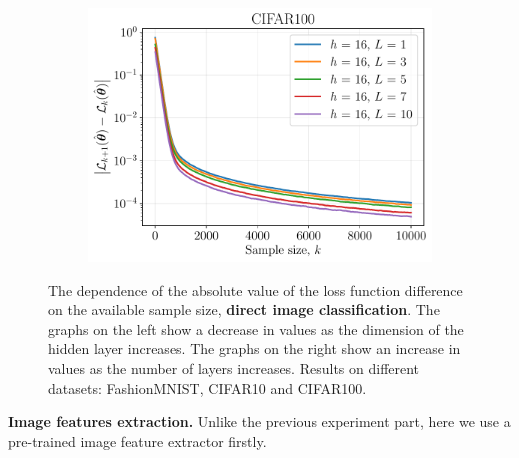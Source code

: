 \documentclass{article}
\begin{document}
\begin{figure}[ht]
\begin{subfigure}[b]{0.5\linewidth}
  \end{subfigure}%
  \begin{subfigure}[b]{0.5\linewidth}
    \centering
    \includegraphics[width=\linewidth]{figs/cifar100_num_layers.pdf} 
  \end{subfigure} 
  \caption{The dependence of the absolute value of the loss function difference on the available sample size, \textbf{direct image classification}. The graphs on the left show a decrease in values as the dimension of the hidden layer increases. The graphs on the right show an increase in values as the number of layers increases. Results on different datasets: FashionMNIST, CIFAR10 and CIFAR100.}
  \label{fig:additional-exp} 
\end{figure}

\textbf{Image features extraction.} Unlike the previous experiment part, here we use a pre-trained image feature extractor firstly. 
\end{document}
